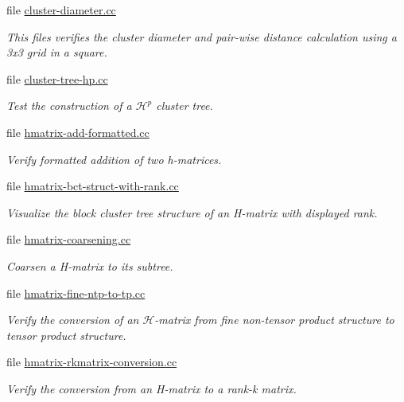 \begin{DoxyCompactItemize}
file \hyperlink{cluster-diameter_8cc}{cluster-\/diameter.\+cc}
\begin{DoxyCompactList}\small\item\em This files verifies the cluster diameter and pair-\/wise distance calculation using a 3x3 grid in a square. \end{DoxyCompactList}\item 
file \hyperlink{cluster-tree-hp_8cc}{cluster-\/tree-\/hp.\+cc}
\begin{DoxyCompactList}\small\item\em Test the construction of a $\mathcal{H}^p$ cluster tree. \end{DoxyCompactList}\item 
file \hyperlink{hmatrix-add-formatted_8cc}{hmatrix-\/add-\/formatted.\+cc}
\begin{DoxyCompactList}\small\item\em Verify formatted addition of two h-\/matrices. \end{DoxyCompactList}\item 
file \hyperlink{hmatrix-bct-struct-with-rank_8cc}{hmatrix-\/bct-\/struct-\/with-\/rank.\+cc}
\begin{DoxyCompactList}\small\item\em Visualize the block cluster tree structure of an H-\/matrix with displayed rank. \end{DoxyCompactList}\item 
file \hyperlink{hmatrix-coarsening_8cc}{hmatrix-\/coarsening.\+cc}
\begin{DoxyCompactList}\small\item\em Coarsen a H-\/matrix to its subtree. \end{DoxyCompactList}\item 
file \hyperlink{hmatrix-fine-ntp-to-tp_8cc}{hmatrix-\/fine-\/ntp-\/to-\/tp.\+cc}
\begin{DoxyCompactList}\small\item\em Verify the conversion of an $\mathcal{H}$-\/matrix from fine non-\/tensor product structure to tensor product structure. \end{DoxyCompactList}\item 
file \hyperlink{hmatrix-rkmatrix-conversion_8cc}{hmatrix-\/rkmatrix-\/conversion.\+cc}
\begin{DoxyCompactList}\small\item\em Verify the conversion from an H-\/matrix to a rank-\/k matrix. \end{DoxyCompactList}\item 

\end{DoxyCompactItemize}
